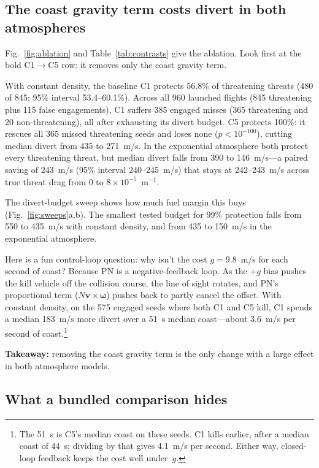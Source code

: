 \documentclass[conference,letterpaper]{IEEEtran}
\newcommand{\vect}[1]{\mathbf{#1}}
\begin{document}
\subsection{The coast gravity term costs divert in both atmospheres}

Fig.~\ref{fig:ablation} and Table~\ref{tab:contrasts} give the ablation.
Look first at the bold C1$\to$C5 row: it removes only the coast gravity term.

With constant density, the baseline C1 protects 56.8\% of threatening threats (480 of 845; 95\% interval 53.4--60.1\%).
Across all 960 launched flights (845 threatening plus 115 false engagements), C1 suffers 385 engaged misses (365 threatening and 20 non-threatening), all after exhausting its divert budget.
C5 protects 100\%: it rescues all 365 missed threatening seeds and loses none ($p < 10^{-100}$), cutting median divert from 435 to 271~m/s.
In the exponential atmosphere both protect every threatening threat, but median divert falls from 390 to 146~m/s—a paired saving of 243~m/s (95\% interval 240--245~m/s) that stays at 242--243~m/s across true threat drag from 0 to $8\times10^{-5}$~m$^{-1}$.

The divert-budget sweep shows how much fuel margin this buys (Fig.~\ref{fig:sweeps}a,b).
The smallest tested budget for 99\% protection falls from 550 to 435~m/s with constant density, and from 435 to 150~m/s in the exponential atmosphere.

Here is a fun control-loop question: why isn't the cost $g = 9.8$~m/s for each second of coast?
Because PN is a negative-feedback loop.
As the $+g$ bias pushes the kill vehicle off the collision course, the line of sight rotates, and PN's proportional term ($N\vect v\times\boldsymbol\omega$) pushes back to partly cancel the offset.
With constant density, on the 575 engaged seeds where both C1 and C5 kill, C1 spends a median 183~m/s more divert over a 51~s median coast—about 3.6~m/s per second of coast.\footnote{The 51~s is C5's median coast on these seeds. C1 kills earlier, after a median coast of 44~s; dividing by that gives 4.1~m/s per second. Either way, closed-loop feedback keeps the cost well under~$g$.}

\textbf{Takeaway:} removing the coast gravity term is the only change with a large effect in both atmosphere models.

\subsection{What a bundled comparison hides}
\end{document}

